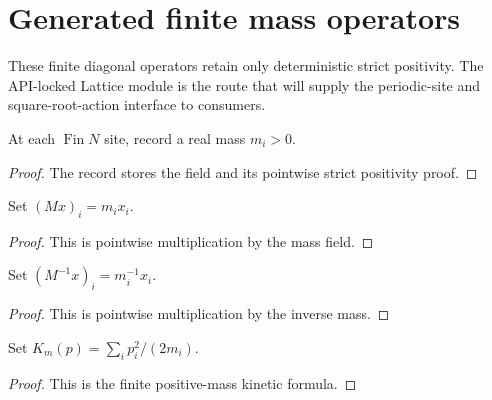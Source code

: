 
\chapter{Generated finite mass operators}
\label{ch:ArchonPhysics_Generated_problem_mass_matrix}

These finite diagonal operators retain only deterministic strict positivity. The API-locked Lattice module is the route that will supply the periodic-site and square-root-action interface to consumers.

\begin{definition}
\label{def:mass:positive-masses}
At each $\operatorname{Fin}N$ site, record a real mass $m_i>0$.
\end{definition}
\begin{proof}The record stores the field and its pointwise strict positivity proof.\end{proof}

\begin{definition}
\label{def:mass:operator}
Set $(Mx)_i=m_ix_i$.
\end{definition}
\begin{proof}This is pointwise multiplication by the mass field.\end{proof}

\begin{definition}
\label{def:mass:inverse-operator}
Set $(M^{-1}x)_i=m_i^{-1}x_i$.
\end{definition}
\begin{proof}This is pointwise multiplication by the inverse mass.\end{proof}

\begin{definition}
\label{def:mass:kinetic}
Set $K_m(p)=\sum_ip_i^2/(2m_i)$.
\end{definition}
\begin{proof}This is the finite positive-mass kinetic formula.\end{proof}

